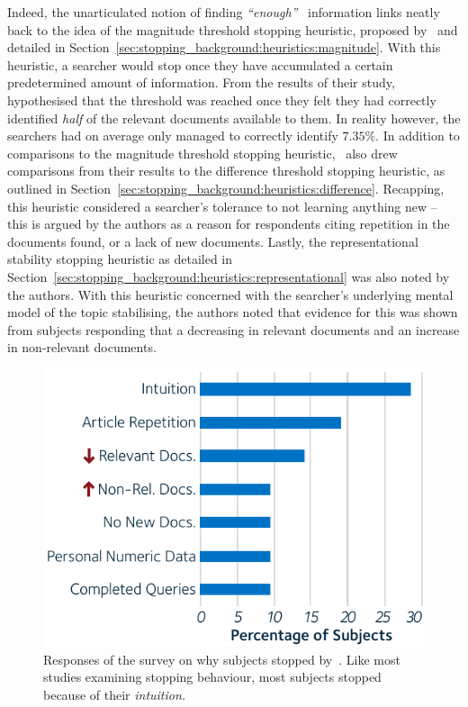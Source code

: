 Indeed, the unarticulated notion of finding \emph{``enough''}~\citep{zach2005enough_is_enough} information links neatly back to the idea of the magnitude threshold stopping heuristic, proposed by~\cite{nickles1995judgment} and detailed in Section~\ref{sec:stopping_background:heuristics:magnitude}. With this heuristic, a searcher would stop once they have accumulated a certain predetermined amount of information. From the results of their study,~\cite{dostert2009satisficing} hypothesised that the threshold was reached once they felt they had correctly identified \emph{half} of the relevant documents available to them. In reality however, the searchers had on average only managed to correctly identify $7.35\%$. In addition to comparisons to the magnitude threshold stopping heuristic,~\cite{dostert2009satisficing} also drew comparisons from their results to the difference threshold stopping heuristic, as outlined in Section~\ref{sec:stopping_background:heuristics:difference}. Recapping, this heuristic considered a searcher's tolerance to not learning anything new -- this is argued by the authors as a reason for respondents citing repetition in the documents found, or a lack of new documents. Lastly, the representational stability stopping heuristic as detailed in Section~\ref{sec:stopping_background:heuristics:representational} was also noted by the authors. With this heuristic concerned with the searcher's underlying mental model of the topic stabilising, the authors noted that evidence for this was shown from subjects responding that a decreasing in relevant documents and an increase in non-relevant documents.

\begin{figure}
    \begin{center}
    \vspace*{-10mm}
    \includegraphics[width=1\textwidth]{figures/ch3-respondents.pdf}
    \end{center}
    \vspace*{-4mm}
    \caption[Responses of a survey by~\cite{dostert2009satisficing}]{Responses of the survey on why subjects stopped by~\cite{dostert2009satisficing}. Like most studies examining stopping behaviour, most subjects stopped because of their \emph{intuition.}}
    \label{fig:stopping_respondents}
\end{figure}

